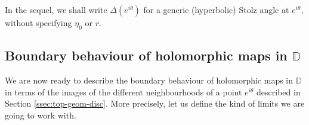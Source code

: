 \documentclass[11pt,a4paper,reqno]{amsart}
\theoremstyle{plain}
\theoremstyle{definition}
\theoremstyle{plain}
\begin{document}
In the sequel, we shall write $ \Delta(e^{i\theta}) $ for a generic (hyperbolic) Stolz angle at $  e^{i\theta}$, without specifying $ \eta_0 $ or $ r $.

\subsection{Boundary behaviour of holomorphic maps in $ \mathbb{D}$}\label{ssec:boundarydisc}

We are now ready to describe the boundary behaviour of holomorphic maps in $ \mathbb{D} $ in terms of the images of the different neighbourhoods of a point $ e^{i\theta} $ described in Section \ref{ssec:top-geom-disc}. More precisely, let us define the kind of limits we are going to work with.
\end{document}
